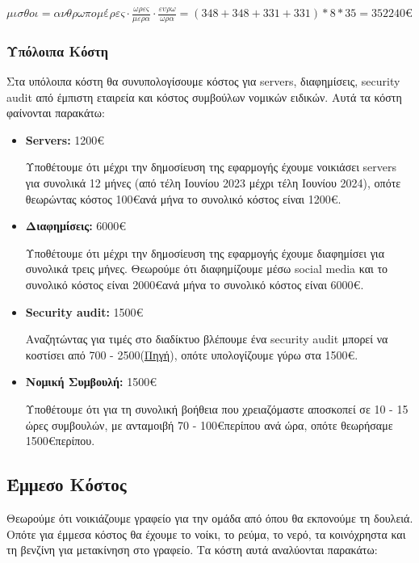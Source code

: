 \documentclass[12pt,a4paper]{article}
\begin{document}
$μισθοι = ανθρωπομέρες \cdot \frac{ωρες}{μερα} \cdot \frac{ευρω}{ωρα} = (348 + 348 + 331 + 331) * 8 * 35 = 352240\euro$

\subsubsection{Υπόλοιπα Κόστη}

Στα υπόλοιπα κόστη θα συνυπολογίσουμε κόστος για servers, διαφημίσεις, security audit από έμπιστη εταιρεία και κόστος συμβούλων νομικών ειδικών. Αυτά τα κόστη φαίνονται παρακάτω:

\begin{itemize}
	\item \textbf{Servers:} 1200\euro

		Υποθέτουμε ότι μέχρι την δημοσίευση της εφαρμογής έχουμε νοικιάσει servers για συνολικά 12 μήνες (από τέλη Ιουνίου 2023 μέχρι τέλη Ιουνίου 2024), οπότε θεωρώντας κόστος 100\euro\space ανά μήνα το συνολικό κόστος είναι 1200\euro.

	\item \textbf{Διαφημίσεις:} 6000\euro

		Υποθέτουμε ότι μέχρι την δημοσίευση της εφαρμογής έχουμε διαφημίσει για συνολικά τρεις μήνες. Θεωρούμε ότι διαφημίζουμε μέσω social media και το συνολικό κόστος είναι 2000\euro\space ανά μήνα το συνολικό κόστος είναι 6000\euro.

	\item \textbf{Security audit:} 1500\euro

		Αναζητώντας για τιμές στο διαδίκτυο βλέπουμε ένα security audit μπορεί να κοστίσει από 700 - 2500\textdollar\space (\href{https://www.getastra.com/blog/security-audit/it-security-audit-cost/}{\color{blue}Πηγή}), οπότε υπολογίζουμε γύρω στα 1500\euro.

	\item \textbf{Νομική Συμβουλή:} 1500\euro

		Υποθέτουμε ότι για τη συνολική βοήθεια που χρειαζόμαστε αποσκοπεί σε 10 - 15 ώρες συμβουλών, με ανταμοιβή 70 - 100\euro\space περίπου ανά ώρα, οπότε θεωρήσαμε 1500\euro\space περίπου.
\end{itemize}

\subsection{Έμμεσο Κόστος}

Θεωρούμε ότι νοικιάζουμε γραφείο για την ομάδα από όπου θα εκπονούμε τη δουλειά. Οπότε για έμμεσα κόστος θα έχουμε το νοίκι, το ρεύμα, το νερό, τα κοινόχρηστα και τη βενζίνη για μετακίνηση στο γραφείο. Τα κόστη αυτά αναλύονται παρακάτω:
\end{document}
